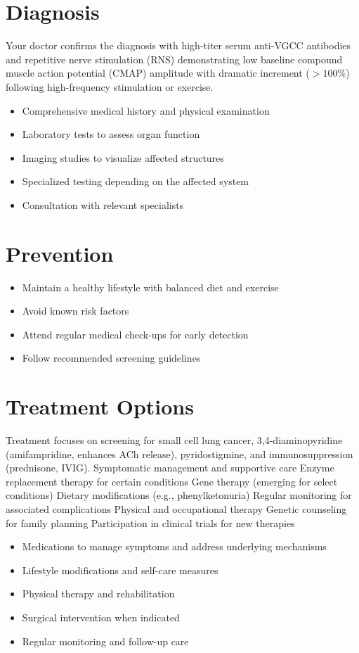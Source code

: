 \section{Diagnosis}
Your doctor confirms the diagnosis with high-titer serum anti-VGCC antibodies and repetitive nerve stimulation (RNS) demonstrating low baseline compound muscle action potential (CMAP) amplitude with dramatic increment ($>100\%$) following high-frequency stimulation or exercise.

\begin{itemize}[noitemsep]
  \item Comprehensive medical history and physical examination
  \item Laboratory tests to assess organ function
  \item Imaging studies to visualize affected structures
  \item Specialized testing depending on the affected system
  \item Consultation with relevant specialists
\end{itemize}
\section{Prevention}
\begin{itemize}[noitemsep]
  \item Maintain a healthy lifestyle with balanced diet and exercise
  \item Avoid known risk factors
  \item Attend regular medical check-ups for early detection
  \item Follow recommended screening guidelines
\end{itemize}
\section{Treatment Options}
Treatment focuses on screening for small cell lung cancer, 3,4-diaminopyridine (amifampridine, enhances ACh release), pyridostigmine, and immunosuppression (prednisone, IVIG). Symptomatic management and supportive care Enzyme replacement therapy for certain conditions Gene therapy (emerging for select conditions) Dietary modifications (e.g., phenylketonuria) Regular monitoring for associated complications Physical and occupational therapy Genetic counseling for family planning Participation in clinical trials for new therapies

\begin{itemize}[noitemsep]
  \item Medications to manage symptoms and address underlying mechanisms
  \item Lifestyle modifications and self-care measures
  \item Physical therapy and rehabilitation
  \item Surgical intervention when indicated
  \item Regular monitoring and follow-up care
\end{itemize}
